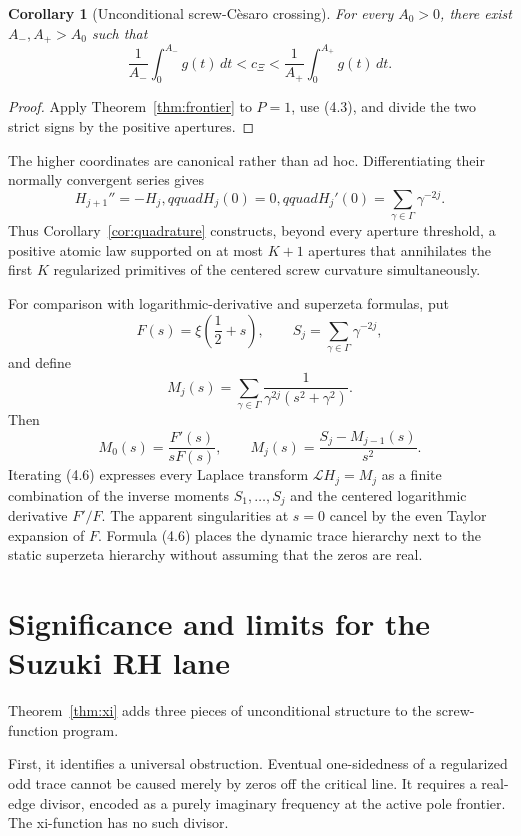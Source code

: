 \documentclass[11pt]{article}
\newtheorem{corollary}[theorem]{Corollary}
\theoremstyle{remark}
\begin{document}
\begin{corollary}[Unconditional screw-C\`esaro crossing]
\label{cor:cesaro}
For every $A_0>0$, there exist $A_-,A_+>A_0$ such that
\[
 \frac1{A_-}\int_0^{A_-}g(t)\,dt<c_\Xi
 <\frac1{A_+}\int_0^{A_+}g(t)\,dt.
 \tag{4.4}
\]
\end{corollary}

\begin{proof}
Apply Theorem~\ref{thm:frontier} to $P=1$, use (4.3), and divide the two strict signs by the
positive apertures.
\end{proof}

The higher coordinates are canonical rather than ad hoc.  Differentiating their normally
convergent series gives
\[
 H_{j+1}''=-H_j,qquad H_j(0)=0,qquad
 H_j'(0)=\sum_{\gamma\in\Gamma}\gamma^{-2j}.
 \tag{4.5}
\]
Thus Corollary~\ref{cor:quadrature} constructs, beyond every aperture threshold, a positive atomic
law supported on at most $K+1$ apertures that annihilates the first $K$ regularized primitives of
the centered screw curvature simultaneously.

For comparison with logarithmic-derivative and superzeta formulas, put
\[
 F(s)=\xi\!\left(\frac12+s\right),
 \qquad S_j=\sum_{\gamma\in\Gamma}\gamma^{-2j},
\]
and define
\[
 M_j(s)=\sum_{\gamma\in\Gamma}
 \frac1{\gamma^{2j}(s^2+\gamma^2)}.
\]
Then
\[
 M_0(s)=\frac{F'(s)}{sF(s)},
 \qquad
 M_j(s)=\frac{S_j-M_{j-1}(s)}{s^2}.
 \tag{4.6}
\]
Iterating (4.6) expresses every Laplace transform $\mathcal L H_j=M_j$ as a finite combination of
the inverse moments $S_1,\ldots,S_j$ and the centered logarithmic derivative $F'/F$.  The apparent
singularities at $s=0$ cancel by the even Taylor expansion of $F$.  Formula (4.6) places the dynamic
trace hierarchy next to the static superzeta hierarchy without assuming that the zeros are real.

\section{Significance and limits for the Suzuki RH lane}

Theorem~\ref{thm:xi} adds three pieces of unconditional structure to the screw-function program.

First, it identifies a universal obstruction.  Eventual one-sidedness of a regularized odd trace
cannot be caused merely by zeros off the critical line.  It requires a real-edge divisor, encoded
as a purely imaginary frequency at the active pole frontier.  The xi-function has no such divisor.
\end{document}
